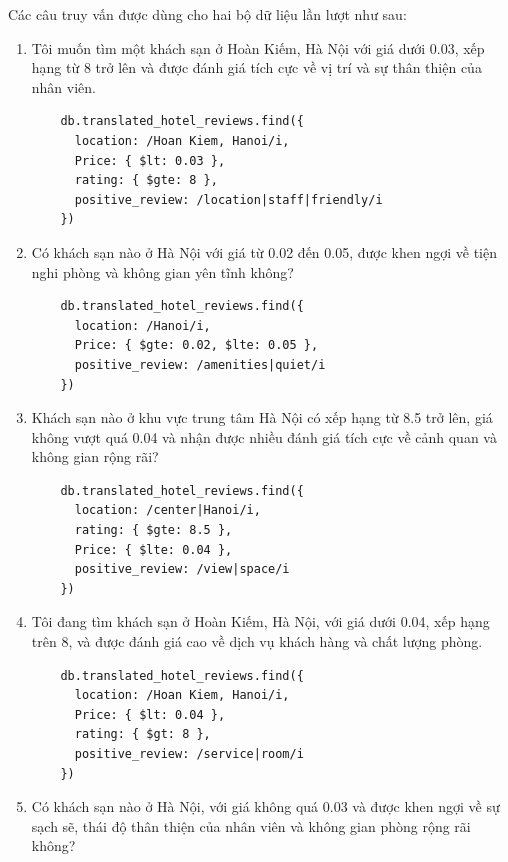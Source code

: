 Các câu truy vấn được dùng cho hai bộ dữ liệu lần lượt như sau:

\begin{enumerate} 
    \item Tôi muốn tìm một khách sạn ở Hoàn Kiếm, Hà Nội với giá dưới 0.03, xếp hạng từ 8 trở lên và được đánh giá tích cực về vị trí và sự thân thiện của nhân viên.

    \begin{verbatim}
    db.translated_hotel_reviews.find({
      location: /Hoan Kiem, Hanoi/i,
      Price: { $lt: 0.03 },
      rating: { $gte: 8 },
      positive_review: /location|staff|friendly/i
    })
    \end{verbatim}

    \item Có khách sạn nào ở Hà Nội với giá từ 0.02 đến 0.05, được khen ngợi về tiện nghi phòng và không gian yên tĩnh không?
    
    \begin{verbatim}
    db.translated_hotel_reviews.find({
      location: /Hanoi/i,
      Price: { $gte: 0.02, $lte: 0.05 },
      positive_review: /amenities|quiet/i
    })
    \end{verbatim}

    \item Khách sạn nào ở khu vực trung tâm Hà Nội có xếp hạng từ 8.5 trở lên, giá không vượt quá 0.04 và nhận được nhiều đánh giá tích cực về cảnh quan và không gian rộng rãi?

    \begin{verbatim}
    db.translated_hotel_reviews.find({
      location: /center|Hanoi/i,
      rating: { $gte: 8.5 },
      Price: { $lte: 0.04 },
      positive_review: /view|space/i
    })
    \end{verbatim}

    \item Tôi đang tìm khách sạn ở Hoàn Kiếm, Hà Nội, với giá dưới 0.04, xếp hạng trên 8, và được đánh giá cao về dịch vụ khách hàng và chất lượng phòng.

    \begin{verbatim}
    db.translated_hotel_reviews.find({
      location: /Hoan Kiem, Hanoi/i,
      Price: { $lt: 0.04 },
      rating: { $gt: 8 },
      positive_review: /service|room/i
    })
    \end{verbatim}

    \item Có khách sạn nào ở Hà Nội, với giá không quá 0.03 và được khen ngợi về sự sạch sẽ, thái độ thân thiện của nhân viên và không gian phòng rộng rãi không?


\end{enumerate}
